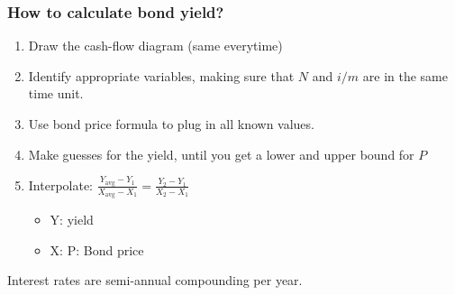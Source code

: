 \subsubsection{How to calculate bond yield?}
\begin{process}
    \begin{enumerate}
        \item Draw the cash-flow diagram (same everytime)
        \item Identify appropriate variables, making sure that $N$ and $i/m$ are in the same time unit.
        \item Use bond price formula to plug in all known values. 
        \item Make guesses for the yield, until you get a lower and upper bound for $P$ 
        \item Interpolate: $\frac{Y_{\text{avg}} - Y_1}{X_{\text{avg}} - X_1} = \frac{Y_2 - Y_1}{X_2 - X_1}$
        \begin{itemize}
            \item Y: yield
            \item X: P: Bond price
        \end{itemize}
    \end{enumerate}
\end{process}

\begin{warning}
    Interest rates are semi-annual compounding per year.
\end{warning}
